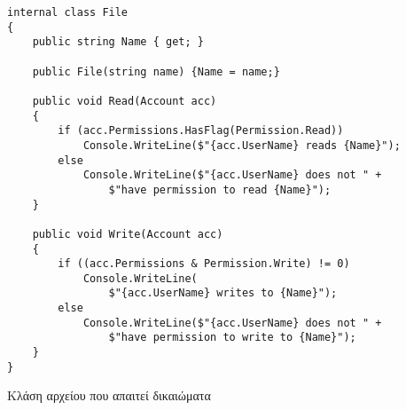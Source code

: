 \begin{listing}[htbp]
\begin{verbatim}
internal class File
{
    public string Name { get; }

    public File(string name) {Name = name;}
    
    public void Read(Account acc)
    {
        if (acc.Permissions.HasFlag(Permission.Read))
            Console.WriteLine($"{acc.UserName} reads {Name}");
        else
            Console.WriteLine($"{acc.UserName} does not " +
                $"have permission to read {Name}");
    }

    public void Write(Account acc)
    {
        if ((acc.Permissions & Permission.Write) != 0)
            Console.WriteLine(
                $"{acc.UserName} writes to {Name}");
        else
            Console.WriteLine($"{acc.UserName} does not " +
                $"have permission to write to {Name}");
    }
}
\end{verbatim}
\caption{Κλάση αρχείου που απαιτεί δικαιώματα}
\label{flagFile}
\end{listing}